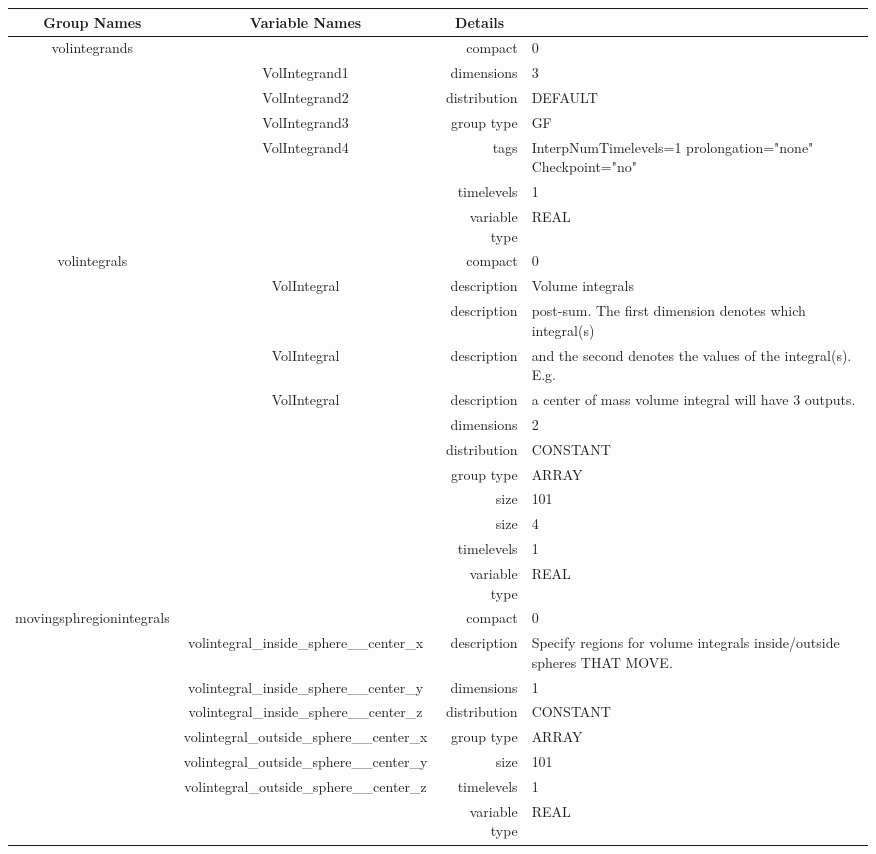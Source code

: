 \vspace{5mm}

\begin{tabular*}{150mm}{|c|c@{\extracolsep{\fill}}|rl|} \hline 
~ {\bf Group Names} ~ & ~ {\bf Variable Names} ~  &{\bf Details} ~ & ~\\ 
\hline 
volintegrands &  & compact & 0 \\ 
 & VolIntegrand1 & dimensions & 3 \\ 
 & VolIntegrand2 & distribution & DEFAULT \\ 
 & VolIntegrand3 & group type & GF \\ 
 & VolIntegrand4 & tags & InterpNumTimelevels=1 prolongation="none" Checkpoint="no" \\ 
 &  & timelevels & 1 \\ 
 &  & variable type & REAL \\ 
\hline 
volintegrals &  & compact & 0 \\ 
 & VolIntegral & description & Volume integrals \\ 
& ~ & description &  post-sum. The first dimension denotes which integral(s) \\ 
 & VolIntegral & description &  and the second denotes the values of the integral(s). E.g. \\ 
 & VolIntegral & description &  a center of mass volume integral will have 3 outputs. \\ 
 &  & dimensions & 2 \\ 
 &  & distribution & CONSTANT \\ 
 &  & group type & ARRAY \\ 
 &  & size & 101 \\ 
& ~ & size & 4 \\ 
 &  & timelevels & 1 \\ 
 &  & variable type & REAL \\ 
\hline 
movingsphregionintegrals &  & compact & 0 \\ 
 & volintegral\_inside\_sphere\_\_center\_x & description & Specify regions for volume integrals inside/outside spheres THAT MOVE. \\ 
 & volintegral\_inside\_sphere\_\_center\_y & dimensions & 1 \\ 
 & volintegral\_inside\_sphere\_\_center\_z & distribution & CONSTANT \\ 
 & volintegral\_outside\_sphere\_\_center\_x & group type & ARRAY \\ 
 & volintegral\_outside\_sphere\_\_center\_y & size & 101 \\ 
 & volintegral\_outside\_sphere\_\_center\_z & timelevels & 1 \\ 
 &  & variable type & REAL \\ 
\hline 
\end{tabular*} 


